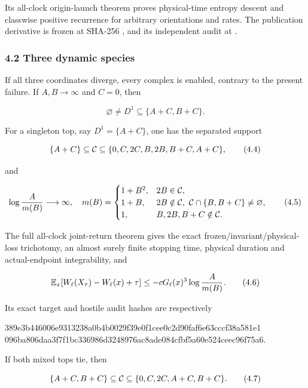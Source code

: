 Its all-clock origin-launch theorem proves physical-time entropy descent
and classwise positive recurrence for arbitrary orientations and rates.
The publication derivative is frozen at SHA-256
\texttt{},
and its independent audit at
\texttt{}.

\subsubsection{4.2 Three dynamic species}

If all three coordinates diverge, every complex is enabled, contrary to
the present failure. If \(A,B\to\infty\) and \(C=0\), then

\[
             \varnothing\ne D^1\subseteq\{A+C,B+C\}.       \tag{4.3}
\]

For a singleton top, say \(D^1=\{A+C\}\), one has the separated support

\[
 \{A+C\}\subseteq{\cal C}
 \subseteq\{0,C,2C,B,2B,B+C,A+C\},                         \tag{4.4}
\]

and

\[
             \log{A\over m(B)}\longrightarrow\infty,
 \quad
 m(B)=
 \begin{cases}
  1+B^2,&2B\in{\cal C},\\
  1+B,&2B\notin{\cal C},\ {\cal C}\cap\{B,B+C\}\ne\varnothing,\\
  1,&B,2B,B+C\notin{\cal C}.
 \end{cases}                                               \tag{4.5}
\]

The full all-clock joint-return theorem gives the exact
frozen/invariant/physical-loss trichotomy, an almost surely finite
stopping time, physical duration and actual-endpoint integrability, and

\[
 \mathbb E_x[W_\ell(X_\tau)-W_\ell(x)+\tau]
       \le-cG_\ell(x)^3\log{A\over m(B)}.                  \tag{4.6}
\]

Its exact target and hostile audit hashes are respectively

\begin{CodeBlock}
389e3b446006e9313238a0b4b0029f39e0f1cee0c2d90faf6e63cccf38a581e1
096ba806daa3f7f1bc336986d3248976ac8ade084cfbf5a60e524ceec96f75a6.
\end{CodeBlock}

If both mixed tops tie, then

\[
 \{A+C,B+C\}\subseteq{\cal C}
       \subseteq\{0,C,2C,A+C,B+C\}.                        \tag{4.7}
\]


